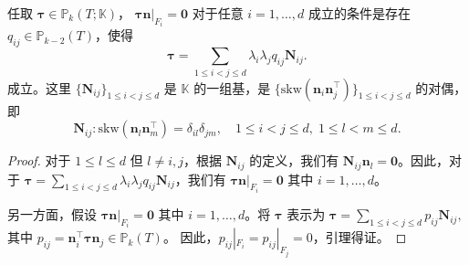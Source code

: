 \begin{lemma}\label{lem:PkKbubblecharac}
任取 $\boldsymbol{\tau}\in\mathbb P_k(T;\mathbb K)$，
$\boldsymbol{\tau}\boldsymbol{n}|_{F_i}=\boldsymbol{0}$ 对于任意 $i=1,\ldots, d$
成立的条件是存在 $q_{ij}\in\mathbb P_{k-2}(T)$，使得
\begin{equation}\label{eq:PkKbubblecharac}
\boldsymbol{\tau}=\sum_{1\leq i<j\leq
d}\lambda_i\lambda_jq_{ij}\boldsymbol{N}_{ij}.
\end{equation}
成立。这里 $\{\boldsymbol{N}_{ij}\}_{1\leq i<j\leq d}$ 是 $\mathbb K$
的一组基，是 $\{\mathrm{skw}({\boldsymbol n_i\boldsymbol n_j^{\intercal}})\}_{1\leq i<j\leq d}$ 的对偶，即
\[
\boldsymbol{N}_{ij}:\mathrm{skw}({\boldsymbol n_l\boldsymbol n_m^{\intercal}})=\delta_{il}\delta_{jm},\quad 1\leq i<j\leq d,\; 1\leq l<m\leq d.
\]
\end{lemma}
\begin{proof}
对于 $1\leq l\leq d$ 但 $l\neq i, j$，根据 $\boldsymbol{N}_{ij}$ 的定义，我们有 $\boldsymbol{N}_{ij}\boldsymbol{n}_l=\boldsymbol{0}$。因此，对于 $
\boldsymbol{\tau}=\sum\limits_{1\leq i<j\leq d}\lambda_i\lambda_jq_{ij}\boldsymbol{N}_{ij}
$，我们有 $\boldsymbol{\tau}\boldsymbol{n}|_{F_i}=\boldsymbol{0}$ 其中 $i=1,\ldots, d$。

另一方面，假设 $\boldsymbol{\tau}\boldsymbol{n}|_{F_i}=\boldsymbol{0}$ 其中 $i=1,\ldots, d$。将 $\boldsymbol{\tau}$ 表示为
$
\boldsymbol{\tau}=\sum_{1\leq i<j\leq d}p_{ij}\boldsymbol{N}_{ij},
$
其中 $p_{ij}=\boldsymbol{n}_i^{\intercal}\boldsymbol{\tau}\boldsymbol{n}_j\in\mathbb P_{k}(T)$。
因此，$p_{ij}|_{F_i}=p_{ij}|_{F_j}=0$，引理得证。
\end{proof}

